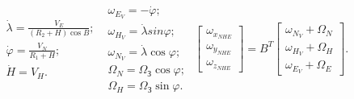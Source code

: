 \documentclass[ucs,compress]{beamer}    %
\begin{document}
\begin{frame}[plain]
\begin{columns}[t]
\begin{column}{5cm}

$\label{eq:geocord} 
\begin{array}{l} 
{\dot{\lambda}=\frac{V_{E}}{(R_{2}+H)\cos B};} \\ 
{\dot{\varphi}=\frac{V_{N}}{R_{1}+H} ;} \\ 
{\dot{H}=V_{H}.} 
\end{array} $
\vspace{3mm}
$\label{eq:__8_26_} 
\begin{array}{l} 
{\omega_{E_{V}} =-\dot{\varphi};} \\ 
{\omega_{H_{V}} =\dot{\lambda}{sin}\varphi;} \\ 
{\omega_{N_{V}} =\dot{\lambda}\cos \varphi;} \\ 
{\Omega_{N} =\Omega_{\text{З}}\cos \varphi;} \\ 
{\Omega_{H} =\Omega_{\text{З}}\sin \varphi.} 
\end{array} $ 
\vspace{3mm}
$\label{eq:lomega}
\left[\begin{array}{c} 
{\omega_{x_{NHE}}} \\ 
{\omega_{y_{NHE}}} \\ 
{\omega_{z_{NHE}}} \end{array}\right]=B^{T} 
\left[\begin{array}{c} 
{\omega_{N_{V}} +\Omega_{N}} \\ 
{\omega_{H_{V}} +\Omega_{H}} \\ 
{\omega_{E_{V}} +\Omega_{E}} 
\end{array}\right].$
 
\end{column}
\end{columns}


\end{frame}
\end{document}

